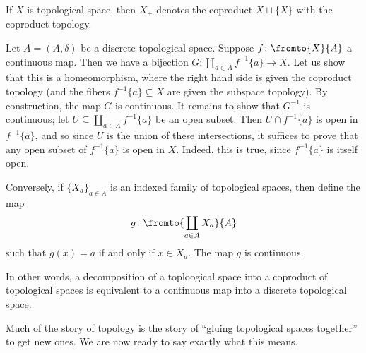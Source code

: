 \begin{exm}
	If $X$ is topological space, then $X_+$ denotes the coproduct $X\sqcup\{X\}$ with the coproduct topology.
\end{exm}

\begin{exm}
	Let $A = (A,\delta)$ be a discrete topological space.
	Suppose $f\colon\fromto{X}{A}$ a continuous map.
	Then we have a bijection $G \colon \coprod_{a\in A}f^{-1}\{a\} \to X$.
	Let us show that this is a homeomorphism, where the right hand side is given the coproduct topology (and the fibers $f^{-1}\{a\} \subseteq X$ are given the subspace topology).
	By construction, the map $G$ is continuous.
	It remains to show that $G^{-1}$ is continuous;
	let $U \subseteq \coprod_{a\in A}f^{-1}\{a\}$ be an open subset.
	Then $U \cap f^{-1}\{a\}$ is open in $f^{-1}\{a\}$, and so since $U$ is the union of these intersections, it suffices to prove that any open subset of $f^{-1}\{a\}$ is open in $X$.
	Indeed, this is true, since $f^{-1}\{a\}$ is itself open.

	Conversely, if $\{X_a\}_{a\in A}$ is an indexed family of topological spaces, then define the map
	\[
		g\colon\fromto{\coprod_{a\in A}X_a}{A}
	\]
	such that $g(x)=a$ if and only if $x\in X_a$.
	The map $g$ is continuous.

	In other words, a decomposition of a toploogical space into a coproduct of topological spaces is equivalent to a continuous map into a discrete topological space.
\end{exm}


Much of the story of topology is the story of ``gluing topological spaces together'' to get new ones.
We are now ready to say exactly what this means.

